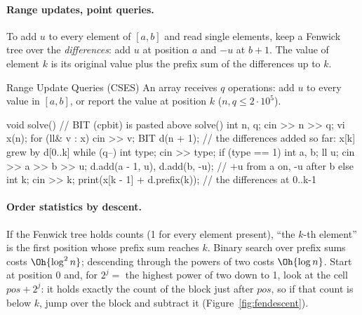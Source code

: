 
\paragraph{Range updates, point queries.} To add $u$ to every element of $[a, b]$ and read single elements, keep a Fenwick tree over
the \emph{differences}: add $u$ at position $a$ and $-u$ at $b + 1$. The value of element $k$ is its original value plus the prefix sum of
the differences up to $k$.

\begin{problem}{Range Update Queries (CSES)}
An array receives $q$ operations: add $u$ to every value in $[a, b]$, or report the value at position $k$ ($n, q \le 2 \cdot 10^5$).
\end{problem}

\begin{code}
void solve() {  // BIT (cpbit) is pasted above solve()
    int n, q;
    cin >> n >> q;
    vi x(n);
    for (ll& v : x) cin >> v;
    BIT d(n + 1);  // the differences added so far: x[k] grew by d[0..k]
    while (q--) {
        int type;
        cin >> type;
        if (type == 1) {
            int a, b;
            ll u;
            cin >> a >> b >> u;
            d.add(a - 1, u), d.add(b, -u);  // +u from a on, -u after b
        } else {
            int k;
            cin >> k;
            print(x[k - 1] + d.prefix(k));  // the differences at 0..k-1
        }
    }
}
\end{code}

\paragraph{Order statistics by descent.} If the Fenwick tree holds counts (1 for every element present), ``the $k$-th element'' is
the first position whose prefix sum reaches $k$. Binary search over prefix sums costs $\Oh{\log^2 n}$; descending through the powers of
two costs $\Oh{\log n}$. Start at position 0 and, for $2^j = $ the highest power of two down to 1, look at the cell
$\mathit{pos} + 2^j$: it holds exactly the count of the block just after $\mathit{pos}$, so if that count is below $k$, jump over the
block and subtract it (Figure~\ref{fig:fendescent}).

